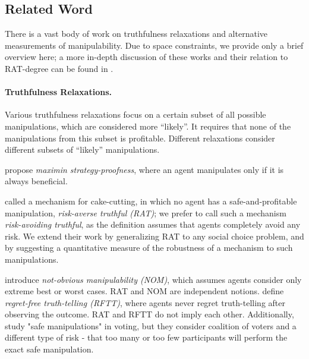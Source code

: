 \subsection{Related Word}
There is a vast body of work on truthfulness relaxations and alternative measurements of manipulability. Due to space constraints, we provide only a brief overview here; a more in-depth discussion of these works and their relation to RAT-degree can be found in .


\paragraph{Truthfulness Relaxations.} Various truthfulness relaxations focus on a certain subset of all possible manipulations, which are considered more ``likely''. It requires that none of the manipulations from this subset is profitable. Different relaxations consider different subsets of ``likely'' manipulations.

\citet{brams2006better} propose \emph{maximin strategy-proofness}, where an agent manipulates only if it is always beneficial.


\citet{BU2023Rat} called a mechanism for cake-cutting, in which no agent has a safe-and-profitable manipulation, \emph{risk-averse truthful (RAT)};
we prefer to call such a mechanism \emph{risk-avoiding truthful}, as the definition assumes that agents completely avoid any risk.
We extend their work by generalizing RAT to any social choice problem, and by suggesting a quantitative measure of the robustness of a mechanism to such manipulations.

\citet{troyan2020obvious} introduce \emph{not-obvious manipulability (NOM)}, which assumes agents consider only extreme best or worst cases. RAT and NOM are independent notions. \citet{regret2018Fernandez} define \emph{regret-free truth-telling (RFTT)}, where agents never regret truth-telling after observing the outcome. RAT and RFTT do not imply each other. Additionally, \citet{slinko2008nondictatorial,slinko2014ever,hazon2010complexity} study "safe manipulations" in voting, but they consider coalition of voters and a different type of risk - that too many or too few participants will perform the exact safe manipulation.


